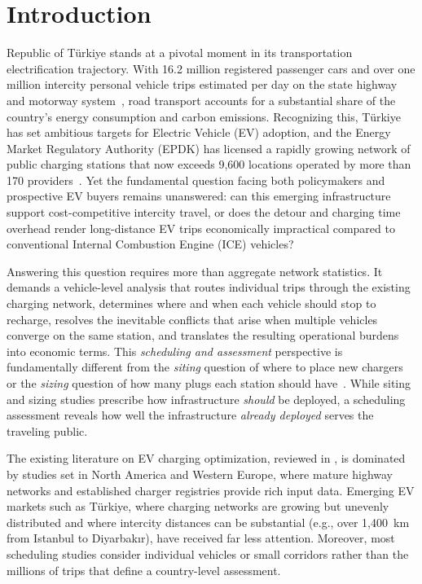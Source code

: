 \section{Introduction}\label{sec:intro}

Republic of T\"{u}rkiye stands at a pivotal moment in its transportation electrification trajectory. With 16.2 million registered passenger cars and over one million intercity personal vehicle trips estimated per day on the state highway and motorway system~\cite{tuik_vehicles_2024,kgm_traffic_2024}, road transport accounts for a substantial share of the country's energy consumption and carbon emissions. Recognizing this, T\"{u}rkiye has set ambitious targets for Electric Vehicle (EV) adoption, and the Energy Market Regulatory Authority (EPDK) has licensed a rapidly growing network of public charging stations that now exceeds 9,600 locations operated by more than 170 providers~\cite{sarjgezgini_2025}. Yet the fundamental question facing both policymakers and prospective EV buyers remains unanswered: can this emerging infrastructure support cost-competitive intercity travel, or does the detour and charging time overhead render long-distance EV trips economically impractical compared to conventional Internal Combustion Engine (ICE) vehicles?

Answering this question requires more than aggregate network statistics. It demands a vehicle-level analysis that routes individual trips through the existing charging network, determines where and when each vehicle should stop to recharge, resolves the inevitable conflicts that arise when multiple vehicles converge on the same station, and translates the resulting operational burdens into economic terms. This \textit{scheduling and assessment} perspective is fundamentally different from the \textit{siting} question of where to place new chargers~\cite{kuby_2005,li_2016} or the \textit{sizing} question of how many plugs each station should have~\cite{upchurch_2009,xiong_2024}. While siting and sizing studies prescribe how infrastructure \textit{should} be deployed, a scheduling assessment reveals how well the infrastructure \textit{already deployed} serves the traveling public.

The existing literature on EV charging optimization, reviewed in , is dominated by studies set in North America and Western Europe, where mature highway networks and established charger registries provide rich input data. Emerging EV markets such as T\"{u}rkiye, where charging networks are growing but unevenly distributed and where intercity distances can be substantial (e.g., over 1,400~km from Istanbul to Diyarbak\i r), have received far less attention. Moreover, most scheduling studies consider individual vehicles or small corridors rather than the millions of trips that define a country-level assessment.

